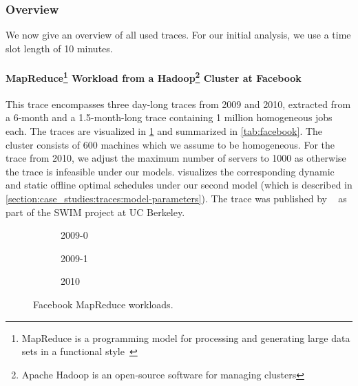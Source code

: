 \subsubsection{Overview}

We now give an overview of all used traces. For our initial analysis, we use a time slot length of 10 minutes.

\paragraph{MapReduce\footnote{MapReduce is a programming model for processing and generating large data sets in a functional style~\cite{Dean2004}} Workload from a Hadoop\footnote{Apache Hadoop is an open-source software for managing clusters} Cluster at Facebook~\cite{SWIM2013}} This trace encompasses three day-long traces from 2009 and 2010, extracted from a 6-month and a 1.5-month-long trace containing 1 million homogeneous jobs each. The traces are visualized in \cref{fig:facebook:histogram} and summarized in \cref{tab:facebook}. The cluster consists of 600 machines which we assume to be homogeneous. For the trace from 2010, we adjust the maximum number of servers to 1000 as otherwise the trace is infeasible under our models.  visualizes the corresponding dynamic and static offline optimal schedules under our second model (which is described in \cref{section:case_studies:traces:model-parameters}). The trace was published by \citeauthor{SWIM2013}~\cite{SWIM2013} as part of the SWIM project at UC Berkeley.

\begin{figure}
    \begin{subfigure}[b]{.3425\linewidth}
    \resizebox{\textwidth}{!}{}
    \caption{2009-0}
    \end{subfigure}
    \begin{subfigure}[b]{.32\linewidth}
    \resizebox{\textwidth}{!}{}
    \caption{2009-1}
    \end{subfigure}
    \begin{subfigure}[b]{.32\linewidth}
    \resizebox{\textwidth}{!}{}
    \caption{2010}
    \end{subfigure}
    \caption{Facebook MapReduce workloads.}
    \label{fig:facebook:histogram}
\end{figure}

